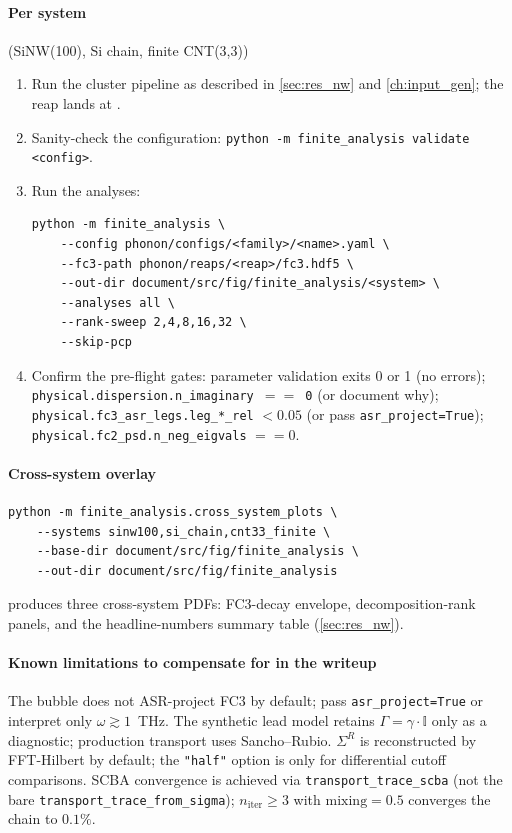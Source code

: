 \paragraph{Per system} (SiNW(100), Si chain, finite CNT(3,3))
\begin{enumerate}
  \item Run the cluster pipeline as described in
    \cref{sec:res_nw} and \cref{ch:input_gen}; the reap lands at
    .
  \item Sanity-check the configuration:
    \verb|python -m finite_analysis validate <config>|.
  \item Run the analyses:
    \begin{verbatim}
python -m finite_analysis \
    --config phonon/configs/<family>/<name>.yaml \
    --fc3-path phonon/reaps/<reap>/fc3.hdf5 \
    --out-dir document/src/fig/finite_analysis/<system> \
    --analyses all \
    --rank-sweep 2,4,8,16,32 \
    --skip-pcp
    \end{verbatim}
  \item Confirm the pre-flight gates: parameter validation exits 0
    or 1 (no errors); \texttt{physical.dispersion.n\_imaginary $==$ 0}
    (or document why); \texttt{physical.fc3\_asr\_legs.leg\_*\_rel}
    $< 0.05$ (or pass \texttt{asr\_project=True}); \texttt{physical.fc2\_psd.n\_neg\_eigvals}
    $== 0$.
\end{enumerate}

\paragraph{Cross-system overlay}
\begin{verbatim}
python -m finite_analysis.cross_system_plots \
    --systems sinw100,si_chain,cnt33_finite \
    --base-dir document/src/fig/finite_analysis \
    --out-dir document/src/fig/finite_analysis
\end{verbatim}
produces three cross-system PDFs: FC3-decay envelope,
decomposition-rank panels, and the headline-numbers summary table
(\cref{sec:res_nw}).

\paragraph{Known limitations to compensate for in the writeup}
The bubble does not ASR-project FC3 by default; pass
\texttt{asr\_project=True} or interpret only $\omega \gtrsim 1$~THz.
The synthetic lead model retains $\Gamma = \gamma\cdot \mathbb{I}$
only as a diagnostic; production transport uses Sancho--Rubio.
$\Sigma^R$ is reconstructed by FFT-Hilbert by default; the
\texttt{"half"} option is only for differential cutoff comparisons.
SCBA convergence is achieved via \texttt{transport\_trace\_scba} (not
the bare \texttt{transport\_trace\_from\_sigma}); $n_{\mathrm{iter}}
\ge 3$ with $\mathrm{mixing} = 0.5$ converges the chain to $0.1\%$.

